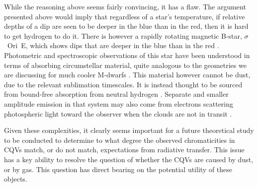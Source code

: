 \documentclass[11pt,twocolumn,tighten]{aastex63}
\begin{document}
While the reasoning above seems fairly convincing, it has a
flaw.  The argument presented above would imply that regardless of a
star's temperature, if relative depths of a dip are seen to be deeper
in the blue than in the red, then it is hard to get hydrogen to do it.
There is however a rapidly rotating magnetic B-star, $\sigma$~Ori~E,
which shows dips that are deeper in the blue than in the red
\citep{1977ApJ...216L..31H}.  Photometric and spectroscopic
observations of this star have been understood in terms of absorbing
circumstellar material, quite analogous to the geometries we are
discussing for much cooler M-dwarfs \citep{2005ApJ...630L..81T}.  This
material however cannot be dust, due to the relevant sublimation
timescales.  It is instead thought to be sourced from bound-free
absorption from neutral hydrogen \citep{2005ApJ...630L..81T}.
Separate and smaller amplitude emission in that system may also come
from electrons scattering photospheric light toward the observer when
the clouds are not in transit \citep{2022MNRAS.511.4815B}.

Given these complexities, it clearly seems important for a future
theoretical study to be conducted to determine to what degree the
observed chromaticities in CQVs match, or do not match, expectations
from radiative transfer.  This issue has a key ability to resolve the
question of whether the CQVs are caused by dust, or by gas.  This
question has direct bearing on the potential utility of these objects.

\end{document}
